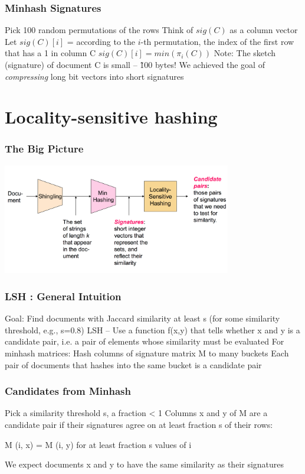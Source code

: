 \documentclass[svgnames]{beamer}
\begin{document}
  
\begin{frame} \frametitle{Minhash Signatures}

Pick 100 random permutations of the rows
Think of $sig(C)$ as a column vector
Let $sig(C)[i]$ = according to the $i$-th permutation, the index of the first row that has a 1 in column C
   $sig(C)[i] = min (\pi_i(C))$
Note: The sketch (signature) of document C is small -- \~100 bytes!
We achieved the goal of \emph{compressing} long bit vectors into short signatures

\end{frame}

  
\section{Locality-sensitive hashing}

  
\begin{frame} \frametitle{The Big Picture}

\includegraphics[width=10cm]{overall}

\end{frame}

  
\begin{frame} \frametitle{LSH : General Intuition}

Goal: Find documents with Jaccard similarity at least s (for some similarity threshold, e.g., s=0.8)
LSH -- Use a function f(x,y) that tells whether x and y is a candidate pair, i.e. a pair of elements whose similarity must be evaluated
For minhash matrices:
  Hash columns of signature matrix M to many buckets
  Each pair of documents that hashes into the same bucket is a candidate pair
  
\end{frame}

  
\begin{frame} \frametitle{Candidates from Minhash}

Pick a similarity threshold s, a fraction < 1
Columns x and y of M are a candidate pair if their signatures agree on at least fraction s of their rows: 

M (i, x) = M (i, y) for at least fraction s values of i

We expect documents x and y to have the same similarity as their signatures

\end{frame}
\end{document}
